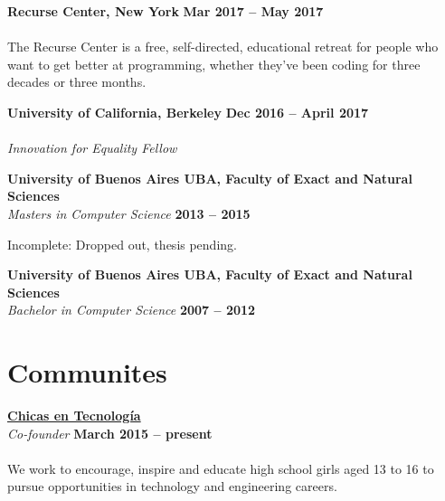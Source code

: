\documentclass[margin,line]{resume}
\begin{document}
\begin{resume}
\textbf{Recurse Center, New York} \hfill \textbf{Mar 2017 -- May 2017}\vspace{-3mm}\\\vspace{-1mm}
\\
The Recurse Center is a free, self-directed, educational retreat for people who want to get better at programming, whether they've been coding for three decades or three months. 

\textbf{University of California, Berkeley} \hfill \textbf{Dec 2016 -- April 2017}\vspace{-3mm}\\\vspace{-1mm}
\\
\textsl{Innovation for Equality Fellow} 

\textbf{University of Buenos Aires UBA, Faculty of Exact and Natural Sciences} \vspace{2mm}\\\vspace{1mm}
\textsl{Masters in Computer Science} \hfill \textbf{2013 -- 2015}\vspace{-3mm}\\\vspace{-1mm}
\begin{list2}
	\item Incomplete: Dropped out, thesis pending.
\end{list2}

\textbf{University of Buenos Aires UBA, Faculty of Exact and Natural Sciences} \vspace{2mm}\\\vspace{1mm}
\textsl{Bachelor in Computer Science} \hfill \textbf{2007 -- 2012}\vspace{-3mm}\\\vspace{-1mm}

\newpage

\section{\mysidestyle Communites}

\textbf{\href{http://www.chicasentecnologia.org/}{Chicas en Tecnolog\'ia}}\\\vspace{1mm}
\textsl{Co-founder} \hfill \textbf{March 2015 -- present}\vspace{-3mm}\\\vspace{-1mm}
\\
We work to encourage, inspire and educate high school girls aged 13 to 16 to pursue opportunities in technology and engineering careers.  


\end{resume}
\end{document}
